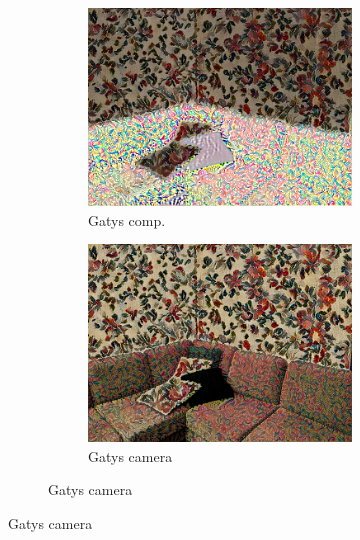 \begin{figure}[]
\begin{subfigure}{\textwidth}
        \hfill
        \begin{subfigure}{0.24\textwidth}
            \centering
            \includegraphics[width=\textwidth]{images/04-experiment02/sofa/flowers/gatys_im.jpg}
            \caption*{Gatys comp.}
        \end{subfigure}
        \hfill
        \begin{subfigure}{0.24\textwidth}
            \centering
            \includegraphics[width=\textwidth]{images/04-experiment02/sofa/flowers/gatys_proj.jpg}
            \caption*{Gatys camera}
        \end{subfigure}
        

\end{subfigure}
\end{figure}
